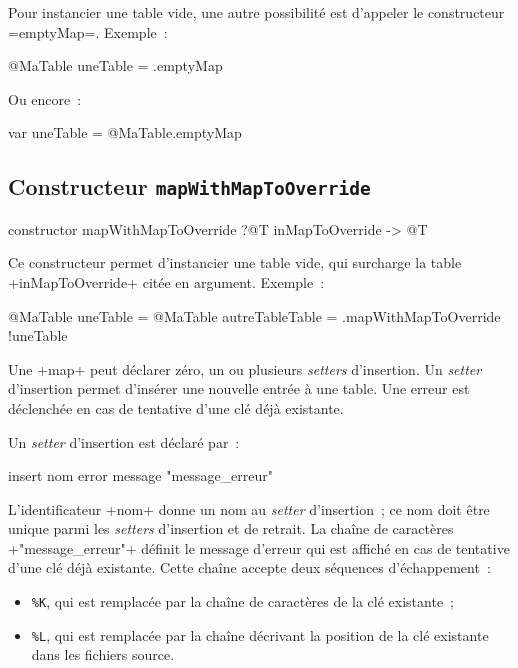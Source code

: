Pour instancier une table vide, une autre possibilité est d'appeler le constructeur \ggsq=emptyMap=. Exemple~:
\begin{galgas4}
@MaTable uneTable = .emptyMap
\end{galgas4}

Ou encore~:

\begin{galgas4}
var uneTable = @MaTable.emptyMap
\end{galgas4}




\subsection{Constructeur \texttt{mapWithMapToOverride}}

\begin{galgas4}
constructor mapWithMapToOverride ?@T inMapToOverride -> @T
\end{galgas4}

Ce constructeur permet d'instancier une table vide, qui surcharge la table \ggsq+inMapToOverride+ citée en argument. Exemple~:
\begin{galgas4}
@MaTable uneTable = {}
@MaTable autreTableTable = .mapWithMapToOverride {!uneTable}
\end{galgas4}







Une \ggsq+map+ peut déclarer zéro, un ou plusieurs \emph{setters} d'insertion. Un \emph{setter} d'insertion permet d'insérer une nouvelle entrée à une table. Une erreur est déclenchée en cas de tentative d'une clé déjà existante.


Un \emph{setter} d'insertion est déclaré par~:

\begin{galgas4}
insert nom error message "message_erreur"
\end{galgas4}

\begin{galgas4}
\end{galgas4}

L'identificateur \ggsq+nom+ donne un nom au \emph{setter} d'insertion~; ce nom doit être unique parmi les \emph{setters} d'insertion et de retrait. La chaîne de caractères \ggsq+"message_erreur"+ définit le message d'erreur qui est affiché en cas de tentative d'une clé déjà existante. Cette chaîne accepte deux séquences d'échappement~:
\begin{itemize}
  \item \texttt{\%K}, qui est remplacée par la chaîne de caractères de la clé existante~;
  \item \texttt{\%L}, qui est remplacée par la chaîne décrivant la position de la clé existante dans les fichiers source.
\end{itemize}


